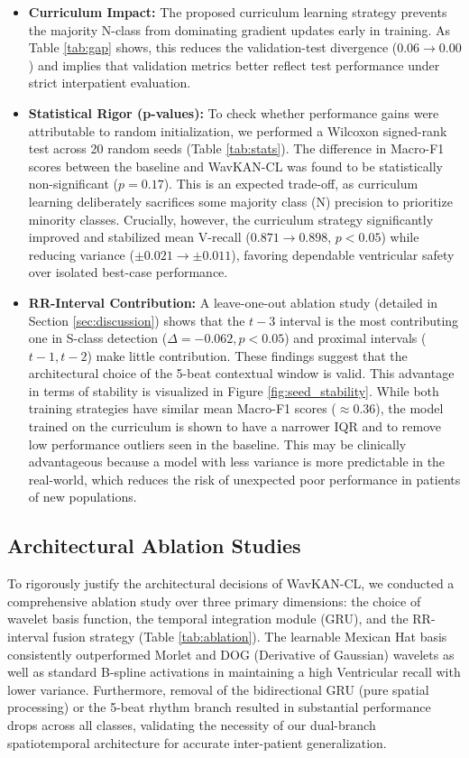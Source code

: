 \documentclass[pdflatex,sn-mathphys-num]{sn-jnl}
\theoremstyle{thmstyleone}
\theoremstyle{thmstyletwo}
\theoremstyle{thmstylethree}
\begin{document}
\begin{itemize}
    \item \textbf{Curriculum Impact:} The proposed curriculum learning strategy prevents the majority N-class from dominating gradient updates early in training. As Table \ref{tab:gap} shows, this reduces the validation-test divergence ($0.06 \to 0.00$) and implies that validation metrics better reflect test performance under strict interpatient evaluation.
    \item \textbf{Statistical Rigor (p-values):} To check whether performance gains were attributable to random initialization, we performed a Wilcoxon signed-rank test across 20 random seeds (Table \ref{tab:stats}). The difference in Macro-F1 scores between the baseline and WavKAN-CL was found to be statistically non-significant ($p = 0.17$). This is an expected trade-off, as curriculum learning deliberately sacrifices some majority class (N) precision to prioritize minority classes. Crucially, however, the curriculum strategy significantly improved and stabilized mean V-recall ($0.871 \to 0.898$, $p < 0.05$) while reducing variance ($\pm 0.021 \to \pm 0.011$), favoring dependable ventricular safety over isolated best-case performance.
    \item \textbf{RR-Interval Contribution:} A leave-one-out ablation study (detailed in Section \ref{sec:discussion}) shows that the $t-3$ interval is the most contributing one in S-class detection ($\Delta = -0.062, p < 0.05$) and proximal intervals ($t-1, t-2$) make little contribution. These findings suggest that the architectural choice of the 5-beat contextual window is valid. This advantage in terms of stability is visualized in Figure \ref{fig:seed_stability}. While both training strategies have similar mean Macro-F1 scores ($\approx 0.36$), the model trained on the curriculum is shown to have a narrower IQR and to remove low performance outliers seen in the baseline. This may be clinically advantageous because a model with less variance is more predictable in the real-world, which reduces the risk of unexpected poor performance in patients of new populations.
\end{itemize}

\subsection{Architectural Ablation Studies}
To rigorously justify the architectural decisions of WavKAN-CL, we conducted a comprehensive ablation study over three primary dimensions: the choice of wavelet basis function, the temporal integration module (GRU), and the RR-interval fusion strategy (Table \ref{tab:ablation}). The learnable Mexican Hat basis consistently outperformed Morlet and DOG (Derivative of Gaussian) wavelets as well as standard B-spline activations in maintaining a high Ventricular recall with lower variance. Furthermore, removal of the bidirectional GRU (pure spatial processing) or the 5-beat rhythm branch resulted in substantial performance drops across all classes, validating the necessity of our dual-branch spatiotemporal architecture for accurate inter-patient generalization.
\end{document}
